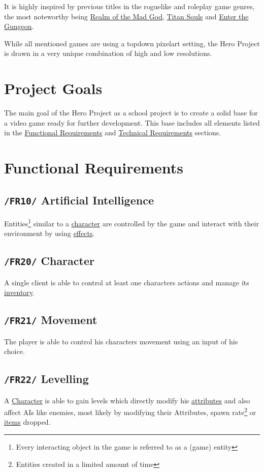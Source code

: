 \documentclass[11pt]{article}
\begin{document}
It is highly inspired by previous titles in the roguelike and roleplay game genres, the most noteworthy being \href{https://realmofthemadgod.com}{Realm of the Mad God}, \href{http://www.devolverdigital.com/games/view/titan-souls}{Titan Souls} and \href{http://dodgeroll.com/gungeon/}{Enter the Gungeon}.

While all mentioned games are using a topdown pixelart setting, the Hero Project is drawn in a very unique combination of high and low resolutions.

\section{Project Goals}
The main goal of the Hero Project as a school project is to create a solid base for a video game ready for further development.
This base includes all elements listed in the \hyperref[sec:fr]{Functional Requirements} and \hyperref[sec:tr]{Technical Requirements} sections.

\newpage

\section{Functional Requirements}\label{sec:fr}
\subsection{\texttt{/FR10/} Artificial Intelligence}\label{subsec:fr10ai}
Entities\footnote{Every interacting object in the game is referred to as a (game) entity} similar to a \hyperref[subsec:fr20character]{character} are controlled by the game and interact with their environment by using \hyperref[subsec:fr30effects]{effects}.
\subsection{\texttt{/FR20/} Character}\label{subsec:fr20character}
A single client is able to control at least one characters actions and manage its \hyperref[subsec:fr41inventory]{inventory}.
\subsection{\texttt{/FR21/} Movement}\label{subsec:fr21movement}
The player is able to control his characters movement using an input of his choice.
\subsection{\texttt{/FR22/} Levelling}\label{subsec:fr22levelling}
A \hyperref[subsec:fr20character]{Character} is able to gain levels which directly modify his \hyperref[subsec:fr50attributes]{attributes} and also affect AIs like enemies, most likely by modifying their Attributes, spawn rate\footnote{Entities created in a limited amount of time} or \hyperref[subsec:fr40items]{items} dropped.
\end{document}
